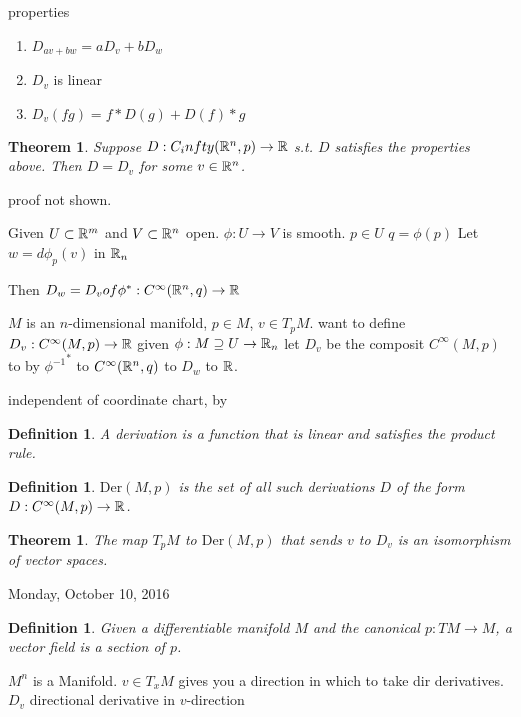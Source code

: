 \documentclass[11pt,leqno,oneside]{amsart}
\newcommand{\Der}{\text{Der}}
\theoremstyle{mystyle} \newtheorem{thrm}[thm]{Theorem}
\theoremstyle{mystyle} \newtheorem{defi}[thm]{Definition}
\begin{document}
properties
\begin{prop}
	\begin{enumerate}
		\item $D_{av + bw} = aD_{v} + bD_{w}$
		\item $D_v$ is linear
		\item $D_v(fg) = f*D(g) + D(f)*g$
	\end{enumerate}
\end{prop}
\begin{thrm}
	Suppose $D : C_infty({\mathbb R}^n,p) \to {\mathbb R}$
	s.t. $D$ satisfies the properties above.  Then $D = D_v$ for some $v \in {\mathbb R}^n$.
\end{thrm}
proof not shown.
\begin{lem}
	Given $U \subset {\mathbb R}^m$ and $V \subset {\mathbb R}^n$ open.
	$\phi : U \to V$ is smooth.
	$p \in U$
	$q = \phi(p)$
	Let
	$w = d \phi_p(v)$ in ${\mathbb R}_n$

	Then
	$D_w = D_v of \phi^* : C^\infty({\mathbb R}^n,q) \to {\mathbb R}$

	$M$ is an $n$-dimensional manifold, $p \in M$, $v \in T_pM$.
	want to define
	$D_v : C^\infty(M,p) \to {\mathbb R}$
	given $\phi: M \supseteq U \to {\mathbb R}_n$ let $D_v$ be the composit
	$C^\infty(M, p)$ to by ${\phi^{-1}}^*$ to $C^\infty({\mathbb R}^n,q)$ to $D_w$ to ${\mathbb R}$.

	independent of coordinate chart, by \end{lem}
\begin{lem}
	\end{lem}
\begin{defi}
	A \emph{derivation} is a function that is linear and satisfies the product rule.
\end{defi}
\begin{defi}
	$\Der(M,p)$ is the set of all such derivations $D$ of the form $D: C^\infty(M,p) \to {\mathbb R}$.
\end{defi}
\begin{thrm}
	The map $T_pM$ to $\Der(M,p)$
	that sends $v$ to $D_v$
	is an isomorphism of vector spaces.
\end{thrm}

Monday, October 10, 2016

\begin{defi}
	Given a differentiable manifold $M$ and the canonical $p: TM \to M$, a \emph{vector field} is a section of $p$.
\end{defi}


$M^n$ is a Manifold.
$v \in T_xM$ gives you a direction in which to take dir derivatives.
$D_v$ directional derivative in $v$-direction
\end{document}
